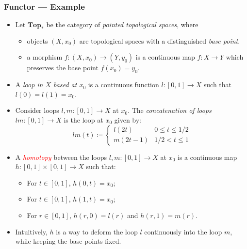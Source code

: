 \documentclass[UTF8,11pt,colorlinks,compress,openany]{beamer}%
\begin{document}
\begin{frame}\frametitle{Functor --- Example}
\setlength\abovedisplayskip{0pt}
\setlength\belowdisplayskip{0pt}
\begin{itemize}
\item Let $\mathbf{Top_*}$ be the category of \emph{pointed topological spaces}, where
\begin{itemize}
\item objects $(X,x_0)$ are topological spaces with a distinguished \emph{base point}.
\item a morphism $f:(X,x_0)\to(Y,y_0)$ is a continuous map $f:X\to Y$ which preserves the base point $f(x_0)=y_0$. 
\end{itemize}
\item A \emph{loop in $X$ based at $x_0$} is a continuous function $l:[0,1]\to X$ such that $l(0)=l(1)=x_0$.
\item Consider loops $l,m:[0,1]\to X$ at $x_0$. The \emph{concatenation of loops} $lm:[0,1]\to X$ is the loop at $x_0$ given by:
\[
lm(t) \coloneqq
\begin{cases}
l(2t) & 0\leq t \leq 1/2 \\
m(2t - 1) & 1/2 < t \leq 1
\end{cases}
\]
\item A \emph{\textcolor{red}{homotopy}} between the loops $l,m:[0,1]\to X$ at $x_0$ is a continuous map $h:[0,1]\times[0,1]\to X$ such that:
\begin{itemize}
 \item For $t\in [0,1]$, $h(0,t)=x_0$;
 \item For $t\in [0,1]$, $h(1,t)=x_0$;
 \item For $r\in [0,1]$, $h(r,0)=l(r)$ and $h(r,1)=m(r)$.
\end{itemize}
\item Intuitively, $h$ is a way to deform the loop $l$ continuously into the loop $m$, while keeping the base points fixed.
\end{itemize}
\end{frame}
\end{document}

